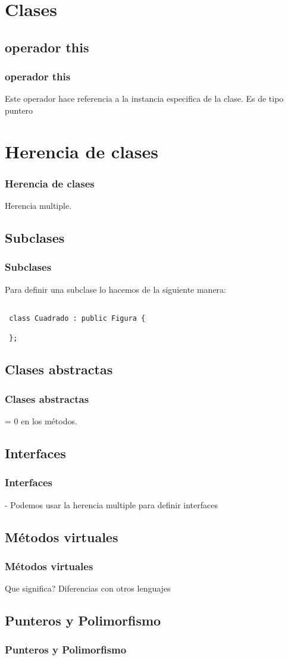 \documentclass{beamer}
\begin{document}
\section{Clases}

\subsection{operador this}
\begin{frame}
\frametitle{operador this}
  Este operador hace referencia a la instancia especifica de la clase. Es de tipo puntero 
\end{frame}

\section{Herencia de clases}
\begin{frame}
\frametitle{Herencia de clases}
Herencia multiple.
\end{frame}

\subsection{Subclases}
\begin{frame}[fragile]
\frametitle{Subclases}

Para definir una subclase lo hacemos de la siguiente manera:

\begin{verbatim}

 class Cuadrado : public Figura {
 
 };
\end{verbatim}

\end{frame}

\subsection{Clases abstractas}
\begin{frame}
\frametitle{Clases abstractas}

 = 0 en los métodos.
\end{frame}

\subsection{Interfaces}
\begin{frame}
\frametitle{Interfaces}
  - Podemos usar la herencia multiple para definir interfaces
\end{frame}

\subsection{Métodos virtuales}
\begin{frame}
\frametitle{Métodos virtuales}
Que significa? 
Diferencias con otros lenguajes
\end{frame}

\subsection{Punteros y Polimorfismo}
\begin{frame}
\frametitle{Punteros y Polimorfismo}
\end{frame}
\end{document}
